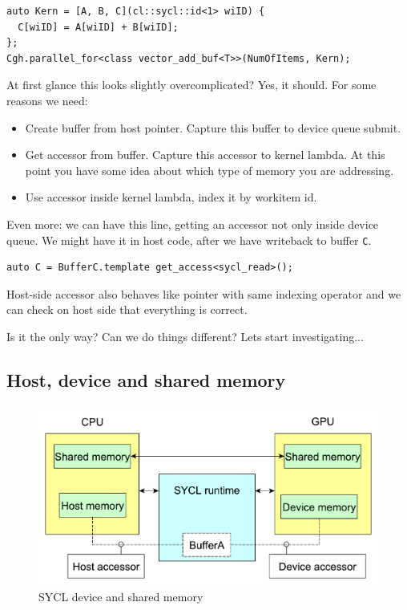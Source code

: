 \documentclass[a4paper,12pt,oneside]{article}
\begin{document}
\begin{lstlisting}
auto Kern = [A, B, C](cl::sycl::id<1> wiID) {
  C[wiID] = A[wiID] + B[wiID];
};
Cgh.parallel_for<class vector_add_buf<T>>(NumOfItems, Kern);
\end{lstlisting}

At first glance this looks slightly overcomplicated? Yes, it should. For some reasons we need:

\begin{itemize}
\item Create buffer from host pointer. Capture this buffer to device queue submit.
\item Get accessor from buffer. Capture this accessor to kernel lambda. At this point you have some idea about which type of memory you are addressing.
\item Use accessor inside kernel lambda, index it by workitem id.
\end{itemize}

Even more: we can have this line, getting an accessor not only inside device queue. We might have it in host code, after we have writeback to buffer \lstinline!C!.

\begin{lstlisting}
auto C = BufferC.template get_access<sycl_read>();
\end{lstlisting}

Host-side accessor also behaves like pointer with same indexing operator and we can check on host side that everything is correct.

Is it the only way? Can we do things different? Lets start investigating...

\subsection{Host, device and shared memory}\label{subsec:HostDevice}


\begin{figure}
\centering
\includegraphics[width=1.0\textwidth]{pictures/sycl-device-and-shared-mem.pdf}
\caption{SYCL device and shared memory}
\label{fig:sycl-device-and-shared-mem}
\end{figure}
\end{document}
